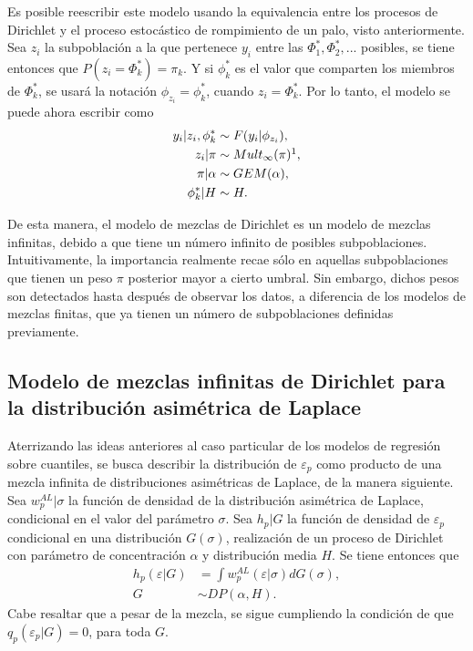 Es posible reescribir este modelo usando la equivalencia entre los procesos de Dirichlet y el proceso estoc\'astico de rompimiento de un palo, visto anteriormente. Sea $z_i$ la subpoblaci\'on a la que pertenece $y_i$ entre las $\Phi_1^*,\Phi_2^*,...$ posibles, se tiene entonces que $P(z_i = \Phi_k^*) = \pi_k$. Y si $\phi_k^*$ es el valor que comparten los miembros de $\Phi_k^*$, se usar\'a la notaci\'on $\phi_{z_i} = \phi_k^*$, cuando $z_i = \Phi_k^*$. Por lo tanto, el modelo se puede ahora escribir como
\begin{equation*}
\begin{aligned}
   y_i | z_i, \phi_k^* &\sim F(y_i | \phi_{z_i}), \\
   z_i | \pi &\sim Mult_\infty(\pi)\footnotemark, \\
   \pi | \alpha &\sim GEM(\alpha), \\
   \phi_k^* | H &\sim H.
\end{aligned}
\end{equation*}


De esta manera, el modelo de mezclas de Dirichlet es un modelo de mezclas infinitas, debido a que tiene un n\'umero infinito de posibles subpoblaciones. Intuitivamente, la importancia realmente recae s\'olo en aquellas subpoblaciones que tienen un peso $\pi$ posterior mayor a cierto umbral. Sin embargo, dichos pesos son detectados hasta despu\'es de observar los datos, a diferencia de los modelos de mezclas finitas, que ya tienen un n\'umero de subpoblaciones definidas previamente.

\subsection{Modelo de mezclas infinitas de Dirichlet para la distribuci\'on asim\'etrica de Laplace}

Aterrizando las ideas anteriores al caso particular de los modelos de regresi\'on sobre cuantiles, se busca describir la distribuci\'on de $\varepsilon_p$ como producto de una mezcla infinita de distribuciones asim\'etricas de Laplace, de la manera siguiente. Sea $w_p^{AL} | \sigma$ la funci\'on de densidad de la distribuci\'on asim\'etrica de Laplace, condicional en el valor del par\'ametro $\sigma$. Sea $h_p|G$ la funci\'on de densidad de $\varepsilon_p$ condicional en una distribuci\'on $G(\sigma)$, realizaci\'on de un proceso de Dirichlet con par\'ametro de concentraci\'on $\alpha$ y distribuci\'on media $H$. Se tiene entonces que
\begin{equation*}
\begin{aligned}
    h_p(\varepsilon|G) &= \int w_p^{AL}(\varepsilon|\sigma)dG(\sigma), \\
    G &\sim DP(\alpha,H).
\end{aligned}
\end{equation*}
Cabe resaltar que a pesar de la mezcla, se sigue cumpliendo la condici\'on de que $q_p(\varepsilon_p|G) = 0$, para toda $G$.

